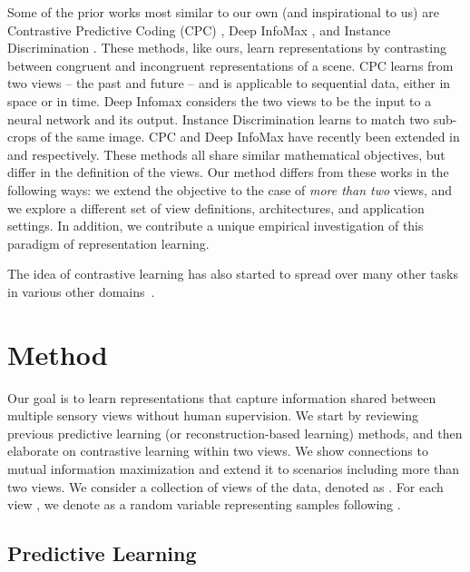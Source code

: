 \documentclass[10pt,twocolumn,letterpaper]{article}
\newcommand{\citep}[1]{\cite{#1}}
\begin{document}
Some of the prior works most similar to our own (and inspirational to us) are Contrastive Predictive Coding (CPC) \citep{oord2018representation}, Deep InfoMax \citep{hjelm2018learning}, and Instance Discrimination \citep{wu2018unsupervised}. These methods, like ours, learn representations by contrasting between congruent and incongruent representations of a scene. CPC learns from two views -- the past and future -- and is applicable to sequential data, either in space or in time. Deep Infomax \citep{hjelm2018learning} considers the two views to be the input to a neural network and its output. Instance Discrimination learns to match two sub-crops of the same image. CPC and Deep InfoMax have recently been extended in \citep{henaff2019data} and \citep{bachman2019learning} respectively. These methods all share similar mathematical objectives, but differ in the definition of the views. Our method differs from these works in the following ways: we extend the objective to the case of \emph{more than two} views, and we explore a different set of view definitions, architectures, and application settings. In addition, we contribute a unique empirical investigation of this paradigm of representation learning. 


The idea of contrastive learning has also started to spread over many other tasks in various other domains~\cite{sun2019contrastive,zhuang2019unsupervised,piergiovanni2019evolving,tschannen2019self,miech2019end,kawakami2020learning,Tian2020Contrastive}.
 
 \vspace{-10pt}
  \section{Method}

Our goal is to learn representations that capture information shared between multiple sensory views without human supervision. We start by reviewing previous predictive learning (or reconstruction-based learning) methods, and then elaborate on contrastive learning within two views. We show connections to mutual information maximization and extend it to scenarios including more than two views. We consider a collection of  views of the data, denoted as . For each view , we denote  as a random variable representing samples following . 

\subsection{Predictive Learning}
\end{document}
